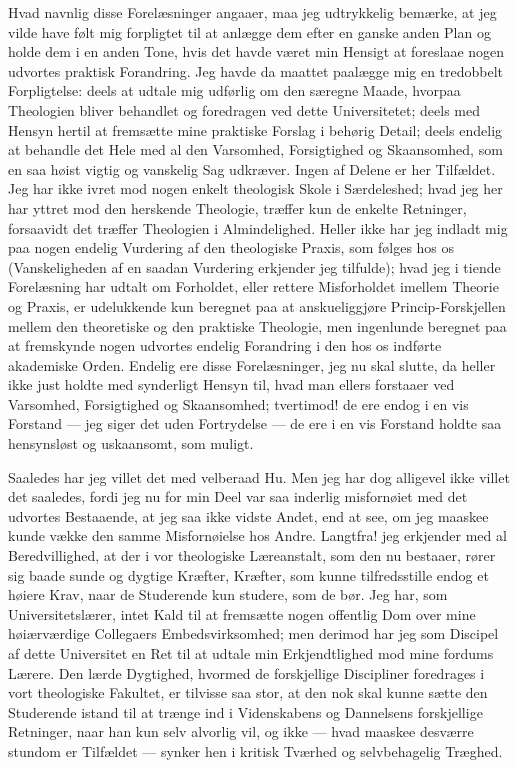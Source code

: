 \documentclass[12pt,a4paper]{book}
\newcommand{\opage}[1]{\marginnote{\footnotesize\textit{[#1]}}}
\begin{document}
Hvad navnlig disse Forelæsninger angaaer, maa jeg udtrykkelig bemærke, at jeg
vilde have følt mig forpligtet til at anlægge dem efter en ganske anden Plan
og holde dem i en anden Tone, hvis det havde været min Hensigt at foreslaae
nogen udvortes praktisk Forandring. Jeg havde da maattet paalægge mig en
tredobbelt Forpligtelse: deels at udtale mig udførlig om den særegne Maade,
hvorpaa Theologien bliver behandlet og foredragen ved dette Universitetet;
deels med Hensyn hertil at fremsætte mine praktiske Forslag i behørig Detail;
deels endelig at behandle det Hele med al den Varsomhed, Forsigtighed og
Skaansomhed, som en saa høist vigtig og vanskelig Sag udkræver. Ingen af
Delene er her Tilfældet. Jeg har ikke ivret mod nogen enkelt theologisk Skole
i Særdeleshed; hvad jeg her har yttret mod den herskende Theologie, træffer
kun de enkelte Retninger, forsaavidt det træffer Theologien i Almindelighed.
Heller ikke har jeg indladt mig paa nogen endelig Vurdering af den
theologiske Praxis, som følges hos os (Vanskeligheden af en saadan Vurdering
erkjender jeg tilfulde); hvad jeg i tiende Forelæsning har udtalt om
Forholdet, eller rettere Misforholdet imellem Theorie og Praxis, er
udelukkende kun beregnet paa at anskueliggjøre Princip-Forskjellen mellem den
theoretiske og den praktiske Theologie, men ingenlunde beregnet paa at
fremskynde nogen udvortes endelig Forandring i den hos os indførte akademiske
Orden. Endelig ere disse Forelæsninger, jeg nu skal slutte, da heller ikke
just holdte med synderligt Hensyn til, hvad man ellers forstaaer ved
Varsomhed, Forsigtighed og Skaansomhed; tvertimod!
\opage{169} de ere endog i en vis Forstand --- jeg siger det uden Fortrydelse --- de ere
i en vis Forstand holdte saa hensynsløst og uskaansomt, som muligt.

Saaledes har jeg villet det med velberaad Hu. Men jeg har dog alligevel ikke
villet det saaledes, fordi jeg nu for min Deel var saa inderlig misfornøiet
med det udvortes Bestaaende, at jeg saa ikke vidste Andet, end at see, om jeg
maaskee kunde vække den samme Misfornøielse hos Andre. Langtfra! jeg
erkjender med al Beredvillighed, at der i vor theologiske Læreanstalt, som
den nu bestaaer, rører sig baade sunde og dygtige Kræfter, Kræfter, som kunne
tilfredsstille endog et høiere Krav, naar de Studerende kun studere, som de
bør. Jeg har, som Universitetslærer, intet Kald til at fremsætte nogen
offentlig Dom over mine høiærværdige Collegaers Embedsvirksomhed; men derimod
har jeg som Discipel af dette Universitet en Ret til at udtale min
Erkjendtlighed mod mine fordums Lærere. Den lærde Dygtighed, hvormed de
forskjellige Discipliner foredrages i vort theologiske Fakultet, er tilvisse
saa stor, at den nok skal kunne sætte den Studerende istand til at trænge ind
i Videnskabens og Dannelsens forskjellige Retninger, naar han kun selv
alvorlig vil, og ikke --- hvad maaskee desværre stundom er Tilfældet ---
synker hen i kritisk Tværhed og selvbehagelig Træghed.
\end{document}

